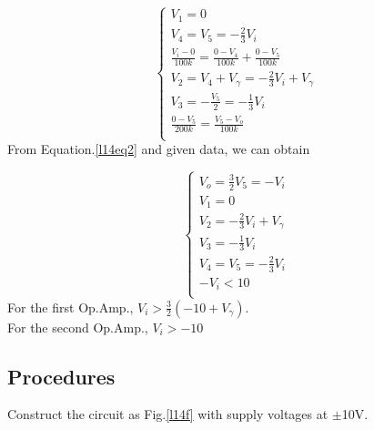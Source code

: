 \begin{itemize}
\begin{equation}
\begin{cases}
                    V_1=0\\
                    V_4=V_5=-\frac{2}{3}V_i\\
                    \frac{V_i-0}{100k}=\frac{0-V_4}{100k}+\frac{0-V_5}{100k}\\
                    V_2=V_4+V_\gamma=-\frac{2}{3}V_i+V_\gamma\\
                    V_3=-\frac{V_5}{2}=-\frac{1}{3}V_i\\
                    \frac{0-V_5}{200k}=\frac{V_5-V_o}{100k}\\
                \end{cases}
                \label{l14eq2}
            \end{equation}
            From Equation.\ref{l14eq2} and given data, we can obtain\par
            \begin{equation}
                \begin{cases}
                V_o=\frac{3}{2}V_5=-V_i\\
                V_1=0\\
                V_2=-\frac{2}{3}V_i+V_\gamma\\
                V_3=-\frac{1}{3}V_i\\
                V_4=V_5=-\frac{2}{3}V_i\\
                -V_i<10\\
                \end{cases}
                \label{l14ceq2}
            \end{equation}
            For the first Op.Amp., $V_i>\frac{3}{2}(-10+V_\gamma)$.\\
            For the second Op.Amp., $V_i>-10$\\
    \end{itemize}
    \FloatBarrier
    
    \subsection{Procedures}
    Construct the circuit as Fig.\ref{l14f} with supply voltages at $\pm$10V.
